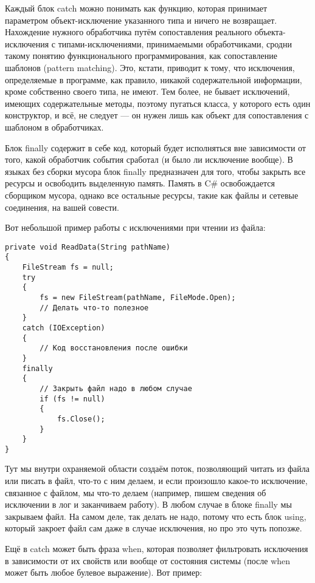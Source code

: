 \documentclass{../../text-style}
\begin{document}
Каждый блок catch можно понимать как функцию, которая принимает параметром объект-исключение указанного типа и ничего не возвращает. Нахождение нужного обработчика путём сопоставления реального объекта-исключения с типами-исключениями, принимаемыми обработчиками, сродни такому понятию функционального программирования, как сопоставление шаблонов (pattern matching). Это, кстати, приводит к тому, что исключения, определяемые в программе, как правило, никакой содержательной информации, кроме собственно своего типа, не имеют. Тем более, не бывает исключений, имеющих содержательные методы, поэтому пугаться класса, у которого есть один конструктор, и всё, не следует --- он нужен лишь как объект для сопоставления с шаблоном в обработчиках.

Блок finally содержит в себе код, который будет исполняться вне зависимости от того, какой обработчик события сработал (и было ли исключение вообще). В языках без сборки мусора блок finally предназначен для того, чтобы закрыть все ресурсы и освободить выделенную память. Память в C\# освобождается сборщиком мусора, однако все остальные ресурсы, такие как файлы и сетевые соединения, на вашей совести. 

Вот небольшой пример работы с исключениями при чтении из файла:

\begin{verbatim}
private void ReadData(String pathName) 
{
    FileStream fs = null;
    try 
    {
        fs = new FileStream(pathName, FileMode.Open);
        // Делать что-то полезное
    }
    catch (IOException) 
    {
        // Код восстановления после ошибки
    }
    finally 
    {
        // Закрыть файл надо в любом случае
        if (fs != null) 
        {
            fs.Close();
        }
    }
}
\end{verbatim}

Тут мы внутри охраняемой области создаём поток, позволяющий читать из файла или писать в файл, что-то с ним делаем, и если произошло какое-то исключение, связанное с файлом, мы что-то делаем (например, пишем сведения об исключении в лог и заканчиваем работу). В любом случае в блоке finally мы закрываем файл. На самом деле, так делать не надо, потому что есть блок using, который закроет файл сам даже в случае исключения, но про это чуть попозже.

Ещё в catch может быть фраза when, которая позволяет фильтровать исключения в зависимости от их свойств или вообще от состояния системы (после when может быть любое булевое выражение). Вот пример:
\end{document}
